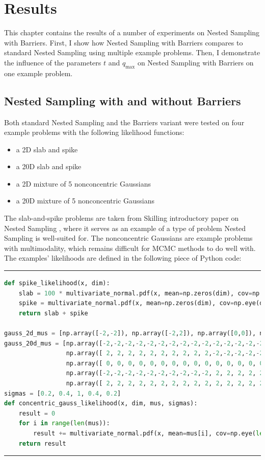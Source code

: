 \documentclass[12pt, a4paper]{report}
\begin{document}
\section{Results}
This chapter contains the results of a number of experiments on Nested Sampling with Barriers.
First, I show how Nested Sampling with Barriers compares to standard Nested Sampling using multiple example problems.
Then, I demonstrate the influence of the parameters $t$ and $q_{\textrm{max}}$ on Nested Sampling with Barriers on one example problem.

\subsection{Nested Sampling with and without Barriers}
Both standard Nested Sampling and the Barriers variant were tested on four example problems with the following likelihood functions:
\begin{itemize}
    \item a 2D slab and spike
    \item a 20D slab and spike
    \item a 2D mixture of 5 nonconcentric Gaussians
    \item a 20D mixture of 5 nonconcentric Gaussians 
\end{itemize}
The slab-and-spike problems are taken from Skilling introductory paper on Nested Sampling \cite{skilling}, where it serves as an example of a type of problem Nested Sampling is well-suited for.
The nonconcentric Gaussians are example problems with multimodality, which remains difficult for MCMC methods to do well with.
The examples' likelihoods are defined in the following piece of Python code:
\vspace{0.4cm}

\hrule
\begin{lstlisting}[language=Python]
def spike_likelihood(x, dim):
    slab = 100 * multivariate_normal.pdf(x, mean=np.zeros(dim), cov=np.eye(dim)*0.01)
    spike = multivariate_normal.pdf(x, mean=np.zeros(dim), cov=np.eye(dim)*0.1)
    return slab + spike

gauss_2d_mus = [np.array([-2,-2]), np.array([-2,2]), np.array([0,0]), np.array([2,-2]), np.array([2, 2])]
gauss_20d_mus = [np.array([-2,-2,-2,-2,-2,-2,-2,-2,-2,-2,-2,-2,-2,-2,-2,-2,-2,-2,-2,-2]),
                 np.array([ 2, 2, 2, 2, 2, 2, 2, 2, 2, 2,-2,-2,-2,-2,-2,-2,-2,-2,-2,-2]),
                 np.array([ 0, 0, 0, 0, 0, 0, 0, 0, 0, 0, 0, 0, 0, 0, 0, 0, 0, 0, 0, 0]),
                 np.array([-2,-2,-2,-2,-2,-2,-2,-2,-2,-2, 2, 2, 2, 2, 2, 2, 2, 2, 2, 2]),
                 np.array([ 2, 2, 2, 2, 2, 2, 2, 2, 2, 2, 2, 2, 2, 2, 2, 2, 2, 2, 2, 2])]
sigmas = [0.2, 0.4, 1, 0.4, 0.2]
def concentric_gauss_likelihood(x, dim, mus, sigmas):
    result = 0
    for i in range(len(mus)):
        result += multivariate_normal.pdf(x, mean=mus[i], cov=np.eye(len(mus[i]))*sigmas[i])
    return result
\end{lstlisting}
\hrule
\end{document}
